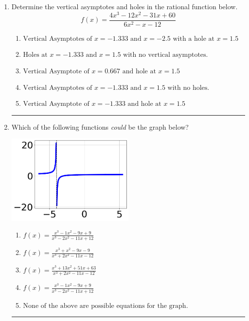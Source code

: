 \documentclass[14pt]{extbook}
\newcommand{\litem}[1]{\item#1\hspace*{-1cm}\rule{\textwidth}{0.4pt}}
\begin{document}
\begin{enumerate}
{\begin{enumerate}[label=\Alph*.]
\end{enumerate} }
\litem{
Determine the vertical asymptotes and holes in the rational function below.\[ f(x) = \frac{4x^{3} -12 x^{2} -31 x + 60}{6x^{2} -x -12} \]\begin{enumerate}[label=\Alph*.]
\item \( \text{Vertical Asymptotes of } x = -1.333 \text{ and } x = -2.5 \text{ with a hole at } x = 1.5 \)
\item \( \text{Holes at } x = -1.333 \text{ and } x = 1.5 \text{ with no vertical asymptotes.} \)
\item \( \text{Vertical Asymptote of } x = 0.667 \text{ and hole at } x = 1.5 \)
\item \( \text{Vertical Asymptotes of } x = -1.333 \text{ and } x = 1.5 \text{ with no holes.} \)
\item \( \text{Vertical Asymptote of } x = -1.333 \text{ and hole at } x = 1.5 \)

\end{enumerate} }
\litem{
Which of the following functions \textit{could} be the graph below?
\begin{center}
    \includegraphics[width=0.5\textwidth]{../Figures/identifyGraphOfRationalFunctionCopyA.png}
\end{center}
\begin{enumerate}[label=\Alph*.]
\item \( f(x)=\frac{x^{3} -1 x^{2} -9 x + 9}{x^{3} -2 x^{2} -11 x + 12} \)
\item \( f(x)=\frac{x^{3} + x^{2} -9 x -9}{x^{3} +2 x^{2} -11 x -12} \)
\item \( f(x)=\frac{x^{3} +13 x^{2} +51 x + 63}{x^{3} +2 x^{2} -11 x -12} \)
\item \( f(x)=\frac{x^{3} -1 x^{2} -9 x + 9}{x^{3} -2 x^{2} -11 x + 12} \)
\item \( \text{None of the above are possible equations for the graph.} \)


\end{enumerate}}
\end{enumerate}
\end{document}
